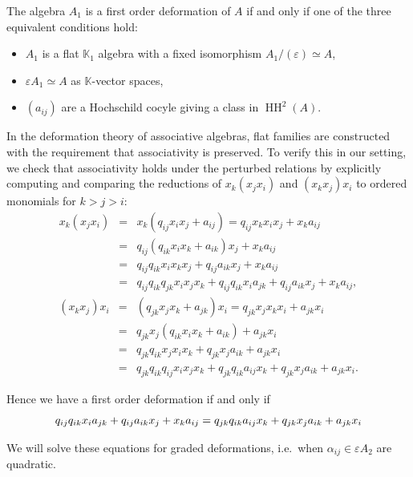 \documentclass{amsart}
\def\HH{\operatorname{HH}}
\begin{document}
\begin{proposition}\cite[Corollary 3.9]{MR1644207}
  The algebra $A_1$ is a  first order deformation of $A$ if and only if one of the three equivalent conditions hold:
  \begin{itemize}
    \item$A_1$ is a flat $\mathbb{K}_1$ algebra with a fixed isomorphism $A_1/(\varepsilon) \simeq A$,
    \item $\varepsilon A_1 \simeq A$ as $\mathbb{K}$-vector spaces,
    \item $(a_{ij})$ are a Hochschild cocyle giving a class in $\HH^2(A)$.
  \end{itemize}
\end{proposition}
In the deformation theory of associative algebras, flat families are constructed with the requirement that associativity is preserved. To verify this in our setting, we check that associativity holds under the perturbed relations by explicitly computing and comparing the reductions of \(  x_k(x_j x_i) \) and \((x_k x_j)x_i \) to ordered monomials for \( k > j > i \):
\begin{eqnarray*}
  x_k(x_jx_i) 
& = & x_k(q_{ij} x_ix_j + a_{ij}) = q_{ij} x_kx_ix_j+ x_k a_{ij} \\
& = & q_{ij} (q_{ik}x_ix_k + a_{ik})x_j +x_ka_{ij}\\
& = & q_{ij}q_{ik}x_ix_kx_j +q_{ij}a_{ik} x_j + x_k a_{ij}\\
& = & q_{ij}q_{ik}q_{jk} x_ix_jx_k + q_{ij}q_{ik}x_ia_{jk} + q_{ij}a_{ik}x_j + x_ka_{ij},
\end{eqnarray*}
\begin{eqnarray*}
(x_kx_j)x_i
& = & (q_{jk} x_jx_k + a_{jk})x_i = q_{jk} x_jx_kx_i+ a_{jk}x_i \\
& = & q_{jk}x_j(q_{ik}x_ix_k+a_{ik}) + a_{jk}x_i \\
& = & q_{jk}q_{ik}x_jx_ix_k+q_{jk}x_ja_{ik}+a_{jk}x_i \\
& = & q_{jk}q_{ik}q_{ij}x_ix_jx_k + q_{jk}q_{ik} a_{ij} x_k +q_{jk}x_ja_{ik} + a_{jk}x_i.
\end{eqnarray*}

Hence we have a first order deformation if and only if
$$q_{ij}q_{ik}x_ia_{jk}+q_{ij}a_{ik}x_j+x_ka_{ij} \\
= q_{jk}q_{ik} a_{ij}x_k + q_{jk}x_ja_{ik} +a_{jk}x_i$$

We will solve these equations for graded deformations, i.e.~when $\alpha_{ij} \in \varepsilon A_2$ are quadratic.
\end{document}
